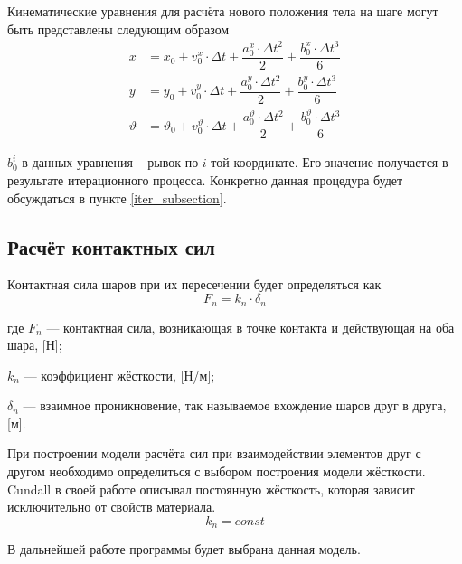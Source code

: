 \documentclass[a4paper]{article}
\begin{document}
Кинематические уравнения для расчёта нового положения тела на шаге могут быть представлены следующим образом
\begin{align}
x &= x_0 + v^x_0 \cdot \Delta t + \dfrac{a^x_0 \cdot \Delta t^2}{2} + \dfrac{b^x_0 \cdot \Delta t^3}{6}\\
y &= y_0 + v^y_0 \cdot \Delta t + \dfrac{a^y_0 \cdot \Delta t^2}{2} + \dfrac{b^y_0 \cdot \Delta t^3}{6}\\
\vartheta &= \vartheta_0 + v^{\vartheta}_0 \cdot \Delta t + \dfrac{a^{\vartheta}_0 \cdot \Delta t^2}{2} + \dfrac{b^{\vartheta}_0 \cdot \Delta t^3}{6}
\end{align}

$b_0^i$ в данных уравнения -- рывок по $i$-той координате. 
Его значение получается в результате итерационного процесса.
Конкретно данная процедура будет обсуждаться в пункте \ref{iter_subsection}.



\subsection{Расчёт контактных сил}
\label{force_subsection}

Контактная сила шаров при их пересечении будет определяться как
\begin{equation}
\label{norm_force}
F_n = k_n \cdot \delta_n
\end{equation}

где $F_n$ --- контактная сила, возникающая в точке контакта и действующая на оба шара, [Н];

$k_n$ --- коэффициент жёсткости, [Н/м];

$\delta_n$ --- взаимное проникновение, так называемое вхождение шаров друг в друга, [м].

При построении модели расчёта сил при взаимодействии элементов друг с другом необходимо определиться с выбором построения модели жёсткости. 
Cundall в своей работе \cite{cundall} описывал постоянную жёсткость, которая зависит исключительно от свойств материала.
\begin{equation}
\label{kn_const}
k_n = const
\end{equation}

В дальнейшей работе программы будет выбрана данная модель.

\end{document}
